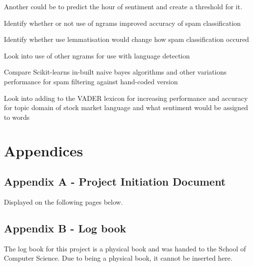 \documentclass[oneside, 12pt]{article}
\begin{document}
		Another could be to predict the hour of sentiment and create a threshold for it.
		
		Identify whether or not use of ngrams improved accuracy of spam classification
		
		Identify whether use lemmatisation would change how spam classification occured
		
		Look into use of other ngrams for use with language detection
		
		Compare Scikit-learns in-built naive bayes algorithms and other variations performance for spam filtering against hand-coded version
		
		Look into adding to the VADER lexicon for increasing performance and accuracy for topic domain of stock market language and what sentiment would be assigned to words
	\newpage
	
	\nocite{*}
	\printbibliography
	
	\newpage
	\section{Appendices}
		\subsection{Appendix A - Project Initiation Document}
		Displayed on the following pages below.
		
		
		\subsection{Appendix B - Log book}
		The log book for this project is a physical book and was handed to the School of Computer Science. Due to being a physical book, it cannot be inserted here.
	
\end{document}
